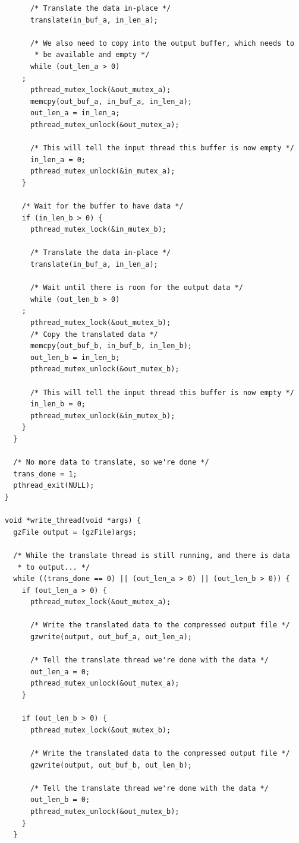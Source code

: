 \documentclass[a4paper,12pt]{article}
\begin{document}
\begin{verbatim}
      /* Translate the data in-place */
      translate(in_buf_a, in_len_a);

      /* We also need to copy into the output buffer, which needs to
       * be available and empty */
      while (out_len_a > 0)
	;
      pthread_mutex_lock(&out_mutex_a);
      memcpy(out_buf_a, in_buf_a, in_len_a);
      out_len_a = in_len_a;
      pthread_mutex_unlock(&out_mutex_a);

      /* This will tell the input thread this buffer is now empty */
      in_len_a = 0;
      pthread_mutex_unlock(&in_mutex_a);
    }
    
    /* Wait for the buffer to have data */
    if (in_len_b > 0) {
      pthread_mutex_lock(&in_mutex_b);

      /* Translate the data in-place */
      translate(in_buf_a, in_len_a);

      /* Wait until there is room for the output data */
      while (out_len_b > 0)
	;
      pthread_mutex_lock(&out_mutex_b);
      /* Copy the translated data */
      memcpy(out_buf_b, in_buf_b, in_len_b);
      out_len_b = in_len_b;
      pthread_mutex_unlock(&out_mutex_b);

      /* This will tell the input thread this buffer is now empty */
      in_len_b = 0;
      pthread_mutex_unlock(&in_mutex_b);
    }
  }

  /* No more data to translate, so we're done */
  trans_done = 1;
  pthread_exit(NULL);
}

void *write_thread(void *args) {
  gzFile output = (gzFile)args;

  /* While the translate thread is still running, and there is data
   * to output... */
  while ((trans_done == 0) || (out_len_a > 0) || (out_len_b > 0)) {
    if (out_len_a > 0) {
      pthread_mutex_lock(&out_mutex_a);

      /* Write the translated data to the compressed output file */
      gzwrite(output, out_buf_a, out_len_a);

      /* Tell the translate thread we're done with the data */
      out_len_a = 0;
      pthread_mutex_unlock(&out_mutex_a);
    }

    if (out_len_b > 0) {
      pthread_mutex_lock(&out_mutex_b);

      /* Write the translated data to the compressed output file */
      gzwrite(output, out_buf_b, out_len_b);

      /* Tell the translate thread we're done with the data */
      out_len_b = 0;
      pthread_mutex_unlock(&out_mutex_b);
    }
  }


\end{verbatim}
\end{document}
